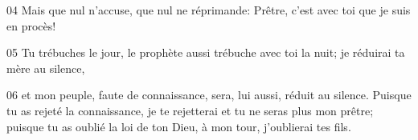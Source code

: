 
04 Mais que nul n’accuse, que nul ne réprimande: Prêtre, c’est avec toi que je suis en procès!

05 Tu trébuches le jour, le prophète aussi trébuche avec toi la nuit; je réduirai ta mère au silence,

06 et mon peuple, faute de connaissance, sera, lui aussi, réduit au silence. Puisque tu as rejeté la connaissance, je te rejetterai et tu ne seras plus mon prêtre; puisque tu as oublié la loi de ton Dieu, à mon tour, j’oublierai tes fils.
